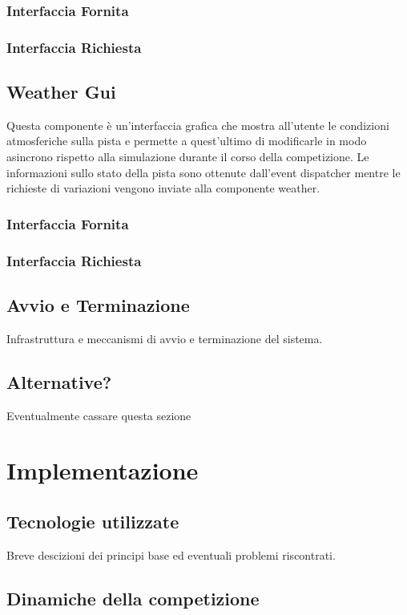 \documentclass[11pt,a4paper]{report}
\begin{document}
\subsection*{Interfaccia Fornita}
\subsection*{Interfaccia Richiesta}
\section{Weather Gui}
Questa componente è un'interfaccia grafica che mostra all'utente le condizioni atmosferiche sulla pista e permette a quest'ultimo di modificarle in modo asincrono rispetto alla simulazione durante il corso della competizione. Le informazioni sullo stato della pista sono ottenute dall'event dispatcher mentre le richieste di variazioni vengono inviate alla componente weather.

\subsection*{Interfaccia Fornita}
\subsection*{Interfaccia Richiesta}
\section{Avvio e Terminazione}
Infrastruttura e meccanismi di avvio e terminazione del sistema.
\section{Alternative?}
Eventualmente cassare questa sezione

\chapter{Implementazione}
\section{Tecnologie utilizzate}
Breve descizioni dei principi base ed eventuali problemi riscontrati.
\section{Dinamiche della competizione}
\end{document}
